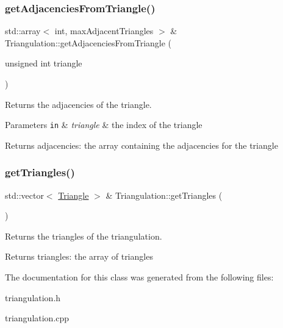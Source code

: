 \subsubsection{\texorpdfstring{get\+Adjacencies\+From\+Triangle()}{getAdjacenciesFromTriangle()}}
{\footnotesize\ttfamily std\+::array$<$ int, max\+Adjacent\+Triangles $>$ \& Triangulation\+::get\+Adjacencies\+From\+Triangle (\begin{DoxyParamCaption}\item[{unsigned int}]{triangle }\end{DoxyParamCaption})}



Returns the adjacencies of the triangle. 


\begin{DoxyParams}[1]{Parameters}
\mbox{\tt in}  & {\em triangle} & the index of the triangle \\
\hline
\end{DoxyParams}
\begin{DoxyReturn}{Returns}
adjacencies\+: the array containing the adjacencies for the triangle 
\end{DoxyReturn}
\mbox{\label{classTriangulation_a9245c1ffae5777f76f51b217f267d594}} 
\subsubsection{\texorpdfstring{get\+Triangles()}{getTriangles()}}
{\footnotesize\ttfamily std\+::vector$<$ \hyperlink{classTriangle}{Triangle} $>$ \& Triangulation\+::get\+Triangles (\begin{DoxyParamCaption}{ }\end{DoxyParamCaption})}



Returns the triangles of the triangulation. 

\begin{DoxyReturn}{Returns}
triangles\+: the array of triangles 
\end{DoxyReturn}


The documentation for this class was generated from the following files\+:\begin{DoxyCompactItemize}
\item 
triangulation.\+h\item 
triangulation.\+cpp\end{DoxyCompactItemize}

